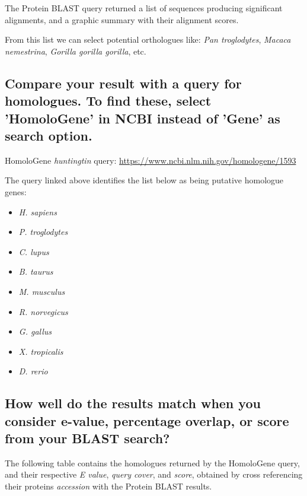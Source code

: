 The Protein BLAST query returned a list of sequences producing significant alignments, and a graphic summary with their alignment scores.

From this list we can select potential orthologues like: \textit{Pan troglodytes}, \textit{Macaca nemestrina}, \textit{Gorilla gorilla gorilla}, etc.


\subsection{Compare your result with a query for homologues. To find these, select 'HomoloGene' in NCBI instead of 'Gene' as search option.}
\label{homologene-results}

HomoloGene \textit{huntingtin} query: \url{https://www.ncbi.nlm.nih.gov/homologene/1593}

The query linked above identifies the list below as being putative homologue genes:

\begin{multicols}{3}
    \begin{itemize}
        \item \textit{H. sapiens}
        \item \textit{P. troglodytes}
        \item \textit{C. lupus}
        \item \textit{B. taurus}
        \item \textit{M. musculus}
        \item \textit{R. norvegicus}
        \item \textit{G. gallus}
        \item \textit{X. tropicalis}
        \item \textit{D. rerio}
    \end{itemize}
\end{multicols}


\subsection{How well do the results match when you consider e-value, percentage overlap, or score from your BLAST search?}

The following table contains the homologues returned by the HomoloGene query, and their respective \textit{E value}, \textit{query cover}, and \textit{score}, obtained by cross referencing their proteins \textit{accession} with the Protein BLAST results.


